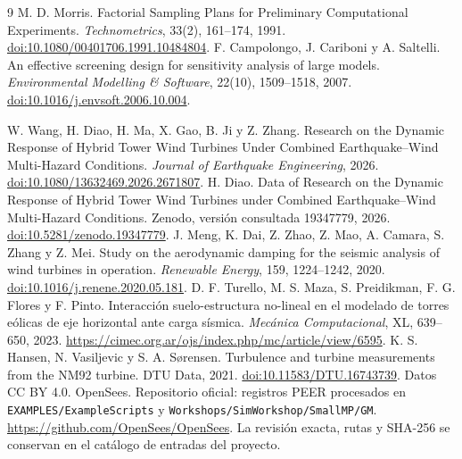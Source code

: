 \documentclass[11pt,a4paper]{article}
\begin{document}
\begin{thebibliography}{9}
 M. D. Morris. Factorial Sampling Plans for Preliminary Computational Experiments. \emph{Technometrics}, 33(2), 161--174, 1991. \href{https://doi.org/10.1080/00401706.1991.10484804}{doi:10.1080/00401706.1991.10484804}.
 F. Campolongo, J. Cariboni y A. Saltelli. An effective screening design for sensitivity analysis of large models. \emph{Environmental Modelling \& Software}, 22(10), 1509--1518, 2007. \href{https://doi.org/10.1016/j.envsoft.2006.10.004}{doi:10.1016/j.envsoft.2006.10.004}.

 W. Wang, H. Diao, H. Ma, X. Gao, B. Ji y Z. Zhang. Research on the Dynamic Response of Hybrid Tower Wind Turbines Under Combined Earthquake--Wind Multi-Hazard Conditions. \emph{Journal of Earthquake Engineering}, 2026. \href{https://doi.org/10.1080/13632469.2026.2671807}{doi:10.1080/13632469.2026.2671807}.
 H. Diao. Data of Research on the Dynamic Response of Hybrid Tower Wind Turbines under Combined Earthquake--Wind Multi-Hazard Conditions. Zenodo, versión consultada 19347779, 2026. \href{https://doi.org/10.5281/zenodo.19347779}{doi:10.5281/zenodo.19347779}.
 J. Meng, K. Dai, Z. Zhao, Z. Mao, A. Camara, S. Zhang y Z. Mei. Study on the aerodynamic damping for the seismic analysis of wind turbines in operation. \emph{Renewable Energy}, 159, 1224--1242, 2020. \href{https://doi.org/10.1016/j.renene.2020.05.181}{doi:10.1016/j.renene.2020.05.181}.
 D. F. Turello, M. S. Maza, S. Preidikman, F. G. Flores y F. Pinto. Interacción suelo-estructura no-lineal en el modelado de torres eólicas de eje horizontal ante carga sísmica. \emph{Mecánica Computacional}, XL, 639--650, 2023. \url{https://cimec.org.ar/ojs/index.php/mc/article/view/6595}.
 K. S. Hansen, N. Vasiljevic y S. A. Sørensen. Turbulence and turbine measurements from the NM92 turbine. DTU Data, 2021. \href{https://doi.org/10.11583/DTU.16743739}{doi:10.11583/DTU.16743739}. Datos CC BY 4.0.
 OpenSees. Repositorio oficial: registros PEER procesados en \texttt{EXAMPLES/ExampleScripts} y \texttt{Workshops/SimWorkshop/SmallMP/GM}. \url{https://github.com/OpenSees/OpenSees}. La revisión exacta, rutas y SHA-256 se conservan en el catálogo de entradas del proyecto.

\end{thebibliography}
\end{document}
